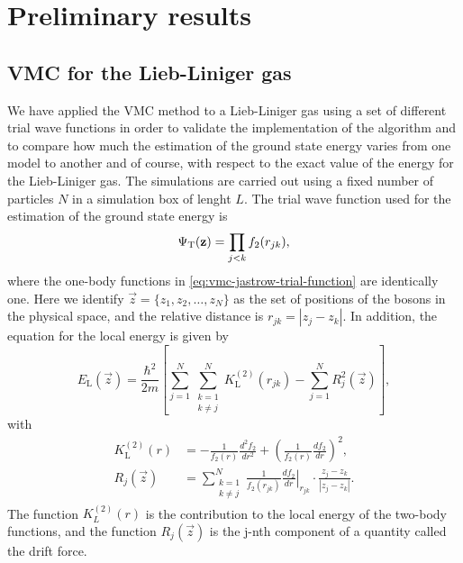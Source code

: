 \section{Preliminary results}

\subsection{VMC for the Lieb-Liniger gas}

We have applied the VMC method to a Lieb-Liniger gas using a set of different
trial wave functions in order to validate the implementation of the algorithm
and to compare how much the estimation of the ground state energy varies from
one model to another and of course, with respect to the exact value of the
energy for the Lieb-Liniger gas. The simulations are carried out using a fixed
number of particles $N$ in a simulation box of lenght $L$. The trial wave
function used for the estimation of the ground state energy is
%
\begin{equation}
  \Psi_{\mathrm{T}}(\mathbf z) = \prod_{j < k} f_2(r_{jk}),
\end{equation}
%
where the one-body functions in \eqref{eq:vmc-jastrow-trial-function} are
identically one. Here we identify $\vec z = \{z_1, z_2, \ldots, z_N \}$ as the
set of positions of the bosons in the physical space, and the relative distance
is $r_{jk} = |z_j - z_k|$. In addition, the equation for the local energy is
given by
%
\begin{equation}
  \label{eq:vmc-lieb-local-energy}
  E_{\mathrm{L}}(\vec z) = \frac{\hbar^2}{2m} \left[ \sum_{j=1}^{N}
    \sum_{\substack{k=1 \\ k \neq j}}^{N} K^{(2)}_{\mathrm{L}} (r_{jk}) -
    \sum_{j=1}^{N} R_{j}^2(\vec z)
    \right],
\end{equation}
%
with
%
\begin{align}
  K^{(2)}_{\mathrm{L}} (r) & = -\frac{1}{f_2(r)} \frac{d^2 f_2}{dr^2} +
  \left( \frac{1}{f_2(r)} \frac{df_2}{dr} \right)^2,                    \\
  R_{j}(\vec z)            & = \sum_{\substack{k=1                      \\ k \neq j}}^{N} \frac{1}{f_2(r_{jk})}
  \left. \frac{d f_2}{dr}  \right|_{r_{jk}} \cdot \frac{z_j - z_k}{|z_j - z_k|}.
\end{align}
%
The function $K_{L}^{(2)}(r)$ is the contribution to the local energy of the
two-body functions, and the function $R_{j}(\vec z)$ is the j-nth component of a
quantity called the drift force.



